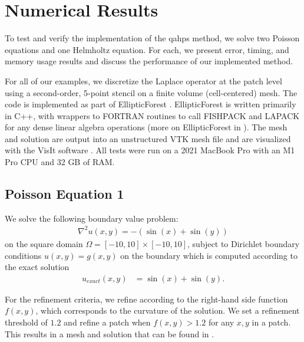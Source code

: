 \section{Numerical Results}
\label{sec:results}

To test and verify the implementation of the \gls{qahps} method, we solve two Poisson equations and one Helmholtz equation. For each, we present error, timing, and memory usage results and discuss the performance of our implemented method.

For all of our examples, we discretize the Laplace operator at the patch level using a second-order, 5-point stencil on a finite volume (cell-centered) mesh. The code is implemented as part of EllipticForest \citep{chipman2024ellipticforest}. EllipticForest is written primarily in C++, with wrappers to FORTRAN routines to call FISHPACK and LAPACK \citep{anderson1999lapack} for any dense linear algebra operations (more on EllipticForest in ). The mesh and solution are output into an unstructured VTK mesh file \citep{kitware2006vtkBook} and are visualized with the VisIt software \citep{HPV:VisIt}. All tests were run on a 2021 MacBook Pro with an M1 Pro CPU and 32 GB of RAM.

\subsection{Poisson Equation 1}
\label{sub:example_one}

We solve the following boundary value problem:
\begin{align}
    \nabla^2 u(x,y) = -(\sin(x) + \sin(y))
\end{align}
on the square domain $\Omega = [-10, 10] \times [-10, 10]$, subject to Dirichlet boundary conditions $u(x,y) = g(x,y)$ on the boundary which is computed according to the exact solution
\begin{align}
    u_{exact}(x,y) &= \sin(x) + \sin(y).
\end{align}

For the refinement criteria, we refine according to the right-hand side function $f(x,y)$, which corresponds to the curvature of the solution. We set a refinement threshold of $1.2$ and refine a patch when $f(x,y) > 1.2$ for any $x,y$ in a patch. This results in a mesh and solution that can be found in .


